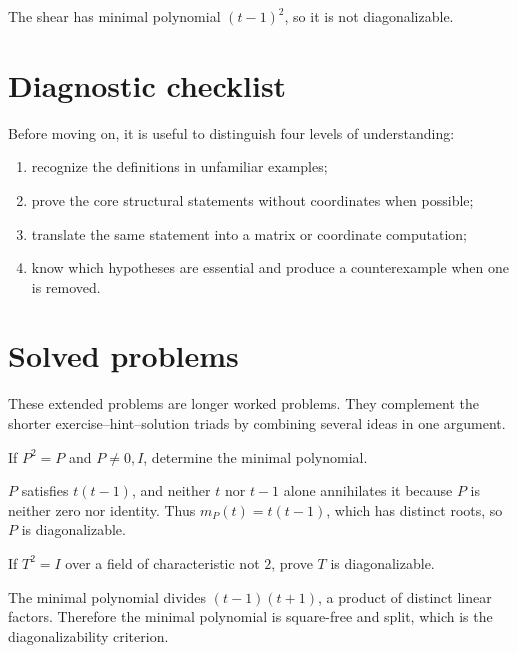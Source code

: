 \begin{example}\label{ex:i11-worked-03}
The shear has minimal polynomial $(t-1)^2$, so it is not diagonalizable.
\end{example}

\section{Diagnostic checklist}
Before moving on, it is useful to distinguish four levels of understanding:
\begin{enumerate}
\item recognize the definitions in unfamiliar examples;
\item prove the core structural statements without coordinates when possible;
\item translate the same statement into a matrix or coordinate computation;
\item know which hypotheses are essential and produce a counterexample when one is removed.
\end{enumerate}

\section{Solved problems}
These extended problems are longer worked problems. They complement the shorter exercise--hint--solution triads by combining several ideas in one argument.

\begin{problem}\label{prob:i11-problem-01}
If $P^2=P$ and $P\ne0,I$, determine the minimal polynomial.
\end{problem}
\begin{solution}
$P$ satisfies $t(t-1)$, and neither $t$ nor $t-1$ alone annihilates it because $P$ is neither zero nor identity. Thus $m_P(t)=t(t-1)$, which has distinct roots, so $P$ is diagonalizable.
\end{solution}

\begin{problem}[Involution]\label{prob:i11-problem-02}
If $T^2=I$ over a field of characteristic not $2$, prove $T$ is diagonalizable.
\end{problem}
\begin{solution}
The minimal polynomial divides $(t-1)(t+1)$, a product of distinct linear factors. Therefore the minimal polynomial is square-free and split, which is the diagonalizability criterion.
\end{solution}

